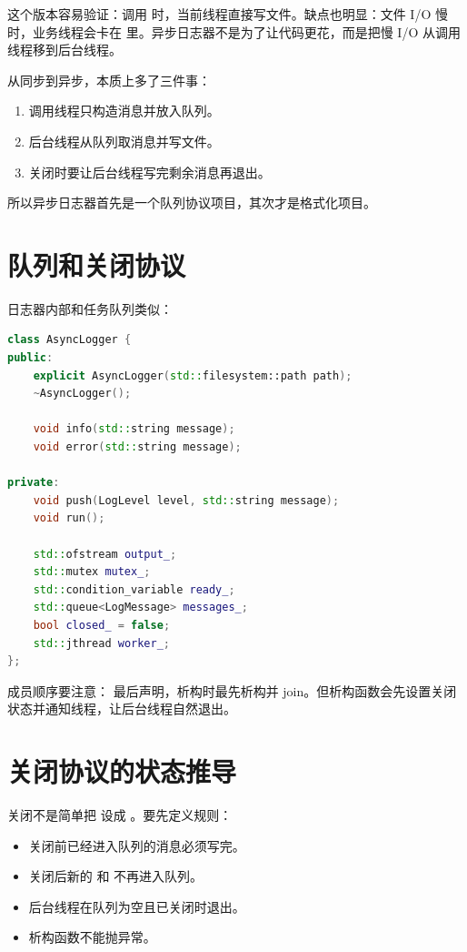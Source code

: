 这个版本容易验证：调用  时，当前线程直接写文件。缺点也明显：文件 I/O 慢时，业务线程会卡在  里。异步日志器不是为了让代码更花，而是把慢 I/O 从调用线程移到后台线程。

从同步到异步，本质上多了三件事：

\begin{enumerate}
  \item 调用线程只构造消息并放入队列。
  \item 后台线程从队列取消息并写文件。
  \item 关闭时要让后台线程写完剩余消息再退出。
\end{enumerate}

所以异步日志器首先是一个队列协议项目，其次才是格式化项目。

\section{队列和关闭协议}

日志器内部和任务队列类似：

\begin{lstlisting}[language=C++,caption={日志器内部状态}]
class AsyncLogger {
public:
    explicit AsyncLogger(std::filesystem::path path);
    ~AsyncLogger();

    void info(std::string message);
    void error(std::string message);

private:
    void push(LogLevel level, std::string message);
    void run();

    std::ofstream output_;
    std::mutex mutex_;
    std::condition_variable ready_;
    std::queue<LogMessage> messages_;
    bool closed_ = false;
    std::jthread worker_;
};
\end{lstlisting}

成员顺序要注意： 最后声明，析构时最先析构并 join。但析构函数会先设置关闭状态并通知线程，让后台线程自然退出。

\section{关闭协议的状态推导}

关闭不是简单把  设成 。要先定义规则：

\begin{itemize}
  \item 关闭前已经进入队列的消息必须写完。
  \item 关闭后新的  和  不再进入队列。
  \item 后台线程在队列为空且已关闭时退出。
  \item 析构函数不能抛异常。
\end{itemize}

